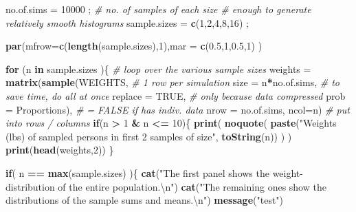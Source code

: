 \documentclass[]{book}
\newenvironment{Shaded}{\begin{snugshade}}{\end{snugshade}}
\newcommand{\CharTok}[1]{\textcolor[rgb]{0.31,0.60,0.02}{#1}}
\newcommand{\CommentTok}[1]{\textcolor[rgb]{0.56,0.35,0.01}{\textit{#1}}}
\newcommand{\ControlFlowTok}[1]{\textcolor[rgb]{0.13,0.29,0.53}{\textbf{#1}}}
\newcommand{\DataTypeTok}[1]{\textcolor[rgb]{0.13,0.29,0.53}{#1}}
\newcommand{\DecValTok}[1]{\textcolor[rgb]{0.00,0.00,0.81}{#1}}
\newcommand{\FloatTok}[1]{\textcolor[rgb]{0.00,0.00,0.81}{#1}}
\newcommand{\KeywordTok}[1]{\textcolor[rgb]{0.13,0.29,0.53}{\textbf{#1}}}
\newcommand{\NormalTok}[1]{#1}
\newcommand{\OperatorTok}[1]{\textcolor[rgb]{0.81,0.36,0.00}{\textbf{#1}}}
\newcommand{\OtherTok}[1]{\textcolor[rgb]{0.56,0.35,0.01}{#1}}
\newcommand{\StringTok}[1]{\textcolor[rgb]{0.31,0.60,0.02}{#1}}
\begin{document}
\begin{Shaded}
\begin{Highlighting}[]
\NormalTok{no.of.sims =}\StringTok{ }\DecValTok{10000}\NormalTok{ ;  }\CommentTok{# no. of samples of each size}
                      \CommentTok{# enough to generate relatively smooth histograms  }
\NormalTok{sample.sizes =}\StringTok{ }\KeywordTok{c}\NormalTok{(}\DecValTok{1}\NormalTok{,}\DecValTok{2}\NormalTok{,}\DecValTok{4}\NormalTok{,}\DecValTok{8}\NormalTok{,}\DecValTok{16}\NormalTok{) ; }

\KeywordTok{par}\NormalTok{(}\DataTypeTok{mfrow=}\KeywordTok{c}\NormalTok{(}\KeywordTok{length}\NormalTok{(sample.sizes),}\DecValTok{1}\NormalTok{),}\DataTypeTok{mar =} \KeywordTok{c}\NormalTok{(}\FloatTok{0.5}\NormalTok{,}\DecValTok{1}\NormalTok{,}\FloatTok{0.5}\NormalTok{,}\DecValTok{1}\NormalTok{) )}

\ControlFlowTok{for}\NormalTok{ (n }\ControlFlowTok{in}\NormalTok{ sample.sizes )\{        }\CommentTok{# loop over the various sample sizes}
\NormalTok{   weights =}\StringTok{ }\KeywordTok{matrix}\NormalTok{(}\KeywordTok{sample}\NormalTok{(WEIGHTS,    }\CommentTok{# 1 row per simulation}
              \DataTypeTok{size =}\NormalTok{ n}\OperatorTok{*}\NormalTok{no.of.sims,     }\CommentTok{# to save time, do all at once}
              \DataTypeTok{replace =} \OtherTok{TRUE}\NormalTok{,          }\CommentTok{# only because data compressed}
              \DataTypeTok{prob =}\NormalTok{ Proportions),     }\CommentTok{# = FALSE if has indiv. data}
          \DataTypeTok{nrow =}\NormalTok{ no.of.sims, }\DataTypeTok{ncol=}\NormalTok{n) }\CommentTok{# put into rows / columns}
   \ControlFlowTok{if}\NormalTok{(n }\OperatorTok{>}\StringTok{ }\DecValTok{1} \OperatorTok{&}\StringTok{ }\NormalTok{n }\OperatorTok{<=}\StringTok{ }\DecValTok{10}\NormalTok{)\{}
     \KeywordTok{print}\NormalTok{( }\KeywordTok{noquote}\NormalTok{(}
      \KeywordTok{paste}\NormalTok{(}\StringTok{"Weights (lbs) of sampled persons in first 2 samples of size"}\NormalTok{,  }
            \KeywordTok{toString}\NormalTok{(n)) )   ) }
     \KeywordTok{print}\NormalTok{(}\KeywordTok{head}\NormalTok{(weights,}\DecValTok{2}\NormalTok{))}
\NormalTok{   \}}
   
   \ControlFlowTok{if}\NormalTok{( n }\OperatorTok{==}\StringTok{ }\KeywordTok{max}\NormalTok{(sample.sizes) )\{}
     \KeywordTok{cat}\NormalTok{(}\StringTok{"The first panel shows the weight-distribution of the entire population.}\CharTok{\textbackslash{}n}\StringTok{"}\NormalTok{)}
     \KeywordTok{cat}\NormalTok{(}\StringTok{"The remaining ones show the  distributions of the sample sums and means.}\CharTok{\textbackslash{}n}\StringTok{"}\NormalTok{)}
     \KeywordTok{message}\NormalTok{(}\StringTok{"test"}\NormalTok{)}
     

\end{Highlighting}
\end{Shaded}
\end{document}
